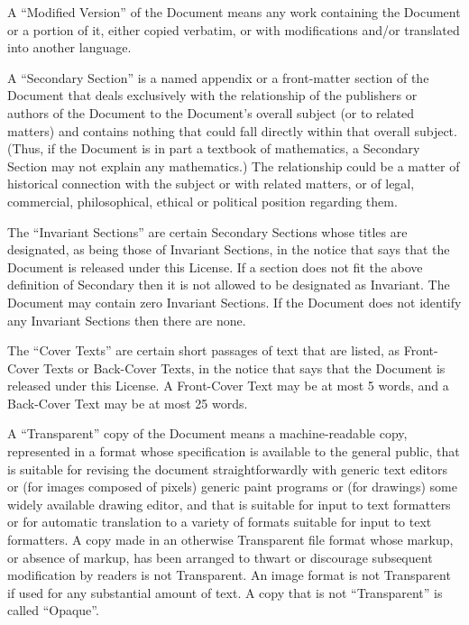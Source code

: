 {\tiny{}A \textquotedblleft Modified Version\textsf{''} of the Document means
any work containing the Document or a portion of it, either copied
verbatim, or with modifications and/or translated into another language.}{\tiny\par}

{\tiny{}A \textquotedblleft Secondary Section\textsf{''} is a named appendix
or a front-matter section of the Document that deals exclusively with
the relationship of the publishers or authors of the Document to the
Document\textsf{'}s overall subject (or to related matters) and contains nothing
that could fall directly within that overall subject. (Thus, if the
Document is in part a textbook of mathematics, a Secondary Section
may not explain any mathematics.) The relationship could be a matter
of historical connection with the subject or with related matters,
or of legal, commercial, philosophical, ethical or political position
regarding them.}{\tiny\par}

{\tiny{}The \textquotedblleft Invariant Sections\textsf{''} are certain Secondary
Sections whose titles are designated, as being those of Invariant
Sections, in the notice that says that the Document is released under
this License. If a section does not fit the above definition of Secondary
then it is not allowed to be designated as Invariant. The Document
may contain zero Invariant Sections. If the Document does not identify
any Invariant Sections then there are none.}{\tiny\par}

{\tiny{}The \textquotedblleft Cover Texts\textsf{''} are certain short passages
of text that are listed, as Front-Cover Texts or Back-Cover Texts,
in the notice that says that the Document is released under this License.
A Front-Cover Text may be at most 5 words, and a Back-Cover Text may
be at most 25 words.}{\tiny\par}

{\tiny{}A \textquotedblleft Transparent\textsf{''} copy of the Document means
a machine-readable copy, represented in a format whose specification
is available to the general public, that is suitable for revising
the document straightforwardly with generic text editors or (for images
composed of pixels) generic paint programs or (for drawings) some
widely available drawing editor, and that is suitable for input to
text formatters or for automatic translation to a variety of formats
suitable for input to text formatters. A copy made in an otherwise
Transparent file format whose markup, or absence of markup, has been
arranged to thwart or discourage subsequent modification by readers
is not Transparent. An image format is not Transparent if used for
any substantial amount of text. A copy that is not \textquotedblleft Transparent\textsf{''}
is called \textquotedblleft Opaque\textsf{''}.}{\tiny\par}

